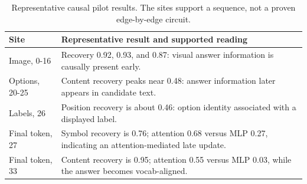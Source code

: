 \documentclass[11pt]{article}
\begin{document}

\begin{table}[t]
    \centering
    \begin{tabularx}{\columnwidth}{@{}lX@{}}
        \toprule
        Site & Representative result and supported reading \\
        \midrule
        Image, 0-16 & Recovery 0.92, 0.93, and 0.87: visual answer information is causally present early. \\

        Options, 20-25 & Content recovery peaks near 0.48: answer information later appears in candidate text. \\

        Labels, 26 & Position recovery is about 0.46: option identity associated with a displayed label. \\

        Final token, 27 & Symbol recovery is 0.76; attention 0.68 versus MLP 0.27, indicating an attention-mediated late update. \\

        Final token, 33 & Content recovery is 0.95; attention 0.55 versus MLP 0.03, while the answer becomes vocab-aligned. \\
        \bottomrule
    \end{tabularx}
    \caption{Representative causal pilot results. The sites support a sequence, not a proven edge-by-edge circuit.}
    \label{tab:pilot-route}
\end{table}
\end{document}
